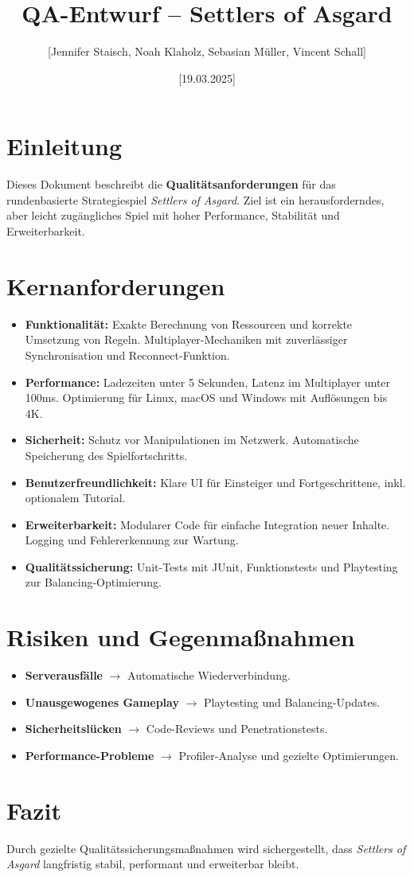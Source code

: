 \documentclass[a4paper,12pt]{article}
\title{\textbf{QA-Entwurf -- Settlers of Asgard}}
\author{[Jennifer Staisch, Noah Klaholz, Sebasian Müller, Vincent Schall]}
\date{[19.03.2025]}
\begin{document}
    \maketitle

    \section*{Einleitung}
    Dieses Dokument beschreibt die \textbf{Qualitätsanforderungen} für das rundenbasierte Strategiespiel \textit{Settlers of Asgard}. Ziel ist ein herausforderndes, aber leicht zugängliches Spiel mit hoher Performance, Stabilität und Erweiterbarkeit.

    \section*{Kernanforderungen}
    \begin{itemize}[leftmargin=0.5cm]
        \item \textbf{Funktionalität:} Exakte Berechnung von Ressourcen und korrekte Umsetzung von Regeln. Multiplayer-Mechaniken mit zuverlässiger Synchronisation und Reconnect-Funktion.
        \item \textbf{Performance:} Ladezeiten unter 5 Sekunden, Latenz im Multiplayer unter 100ms. Optimierung für Linux, macOS und Windows mit Auflösungen bis 4K.
        \item \textbf{Sicherheit:} Schutz vor Manipulationen im Netzwerk. Automatische Speicherung des Spielfortschritts.
        \item \textbf{Benutzerfreundlichkeit:} Klare UI für Einsteiger und Fortgeschrittene, inkl. optionalem Tutorial.
        \item \textbf{Erweiterbarkeit:} Modularer Code für einfache Integration neuer Inhalte. Logging und Fehlererkennung zur Wartung.
        \item \textbf{Qualitätssicherung:} Unit-Tests mit JUnit, Funktionstests und Playtesting zur Balancing-Optimierung.
    \end{itemize}

    \section*{Risiken und Gegenmaßnahmen}
    \begin{itemize}[leftmargin=0.5cm]
        \item \textbf{Serverausfälle} $\rightarrow$ Automatische Wiederverbindung.
        \item \textbf{Unausgewogenes Gameplay} $\rightarrow$ Playtesting und Balancing-Updates.
        \item \textbf{Sicherheitslücken} $\rightarrow$ Code-Reviews und Penetrationstests.
        \item \textbf{Performance-Probleme} $\rightarrow$ Profiler-Analyse und gezielte Optimierungen.
    \end{itemize}

    \section*{Fazit}
    Durch gezielte Qualitätssicherungsmaßnahmen wird sichergestellt, dass \textit{Settlers of Asgard} langfristig stabil, performant und erweiterbar bleibt.
\end{document}
